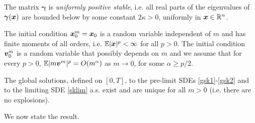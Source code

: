 \begin{ass} \label{a2} The  matrix $\boldsymbol{\gamma}$ is {\it uniformly positive stable}, i.e. all real parts of the eigenvalues of $\boldsymbol{\gamma}(\boldsymbol{x})$ are bounded below by some constant $2\kappa > 0$, uniformly in $\boldsymbol{x}\in \mathbb{R}^n$.
\end{ass}

\begin{ass} \label{a3} The initial condition $\boldsymbol{x}^m_0 = \boldsymbol{x}_0$ is a random variable independent of $m$ and has finite moments of all orders,  i.e. $\mathbb{E} |\boldsymbol{x}|^{p} < \infty$ for all $p > 0$.   The initial condition $\boldsymbol{v}^m_0$ is a  random variable that possibly depends on $m$ and we assume that for every $p>0$, $\mathbb{E} |m \boldsymbol{v}^m|^p = O(m^\alpha)$ as $m \to 0$, for some $\alpha \geq p/2$. 
\end{ass}

\begin{ass} \label{a4} The global solutions, defined on $[0,T]$, to the pre-limit SDEs \eqref{gsk1}-\eqref{gsk2} and to the limiting SDE \eqref{sklim} a.s. exist and are unique for all $m > 0$ (i.e. there are no explosions).  
\end{ass}




We now state the result. 


